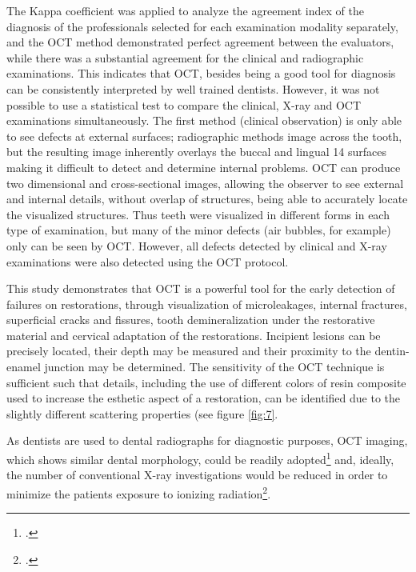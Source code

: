 \documentclass[12pt,twoside,english]{book}
\renewcommand{\~}{\perispomeni}%
\numberwithin{equation}{section}
\numberwithin{figure}{section}
\begin{document}
The Kappa coefficient was applied to analyze the agreement index of the diagnosis of the professionals selected for each examination modality separately, and the OCT method demonstrated perfect agreement between the evaluators, while there was a substantial agreement for the clinical and radiographic examinations. This indicates that OCT, besides being a good tool for diagnosis can be consistently interpreted by well trained dentists. However, it was not possible to use a statistical test to compare the clinical, X-ray and OCT examinations simultaneously. The first method (clinical observation) is only able to see defects at external surfaces; radiographic methods image across the tooth, but the resulting image inherently overlays the buccal and lingual 14 surfaces making it difficult to detect and determine internal problems. OCT can produce two dimensional and cross-sectional images, allowing the observer to see external and internal details, without overlap of structures, being able to accurately locate the visualized structures. Thus teeth were visualized in different forms in each type of examination, but many of the minor defects (air bubbles, for example) only can be seen by OCT. However, all defects detected by clinical and X-ray examinations were also detected using the OCT protocol.

This study demonstrates that OCT is a powerful tool for the early detection of failures on restorations, through visualization of microleakages, internal fractures, superficial cracks and fissures, tooth demineralization under the restorative material and cervical adaptation of the restorations. Incipient lesions can be precisely located, their depth may be measured and their proximity to the dentin-enamel junction may be determined. The sensitivity of the OCT technique is sufficient such that details, including the use of different colors of resin composite used to increase the esthetic aspect of a restoration, can be identified due to the slightly different scattering properties (see figure \ref{fig:7}.

As dentists are used to dental radiographs for diagnostic purposes, OCT imaging, which shows similar dental morphology, could be readily adopted\footcite{ChooSmith:2008p1834} and, ideally, the number of conventional X-ray investigations would be reduced in order to minimize the patients exposure to ionizing radiation\footcite{Brandenburg:2003p2055}.
\end{document}

